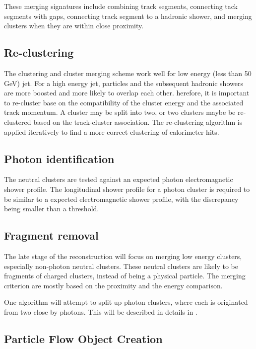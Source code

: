 These merging signatures include combining track segments, connecting tack segments with gaps, connecting track segment to a hadronic shower, and merging clusters when they are within close proximity.

\subsection{Re-clustering}

The clustering and cluster merging scheme work well for low energy (less than 50\,GeV) jet. For a high energy jet, particles and the subsequent hadronic showers are more boosted and more likely to overlap each other. herefore, it is important to re-cluster base on the compatibility of the cluster energy and the associated track momentum. A cluster may be split into two, or two clusters maybe be re-clustered based on the track-cluster association. The re-clustering algorithm is applied iteratively to find a more correct clustering of calorimeter hits.

\subsection{Photon identification}

The neutral clusters are tested against an expected photon electromagnetic shower profile. The longitudinal shower profile for a photon cluster is required to be similar to a expected electromagnetic shower profile, with the discrepancy being smaller than a threshold.

\subsection{Fragment removal}

The late stage of the reconstruction will focus on merging low energy clusters, especially non-photon neutral clusters. These neutral clusters are likely to be fragments of charged clusters, instead of being a physical particle. The merging criterion are mostly based on the proximity and the energy comparison.

One algorithm will attempt to split up photon clusters, where each is originated from two close by photons. This will be described in details in \Chapter{}.

\subsection{Particle Flow Object Creation}

